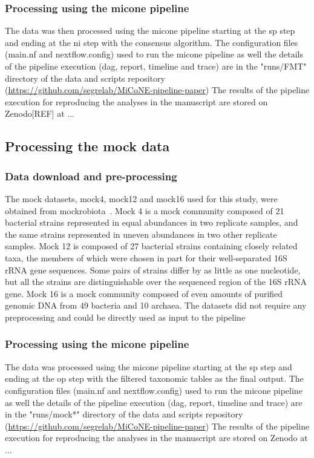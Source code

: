     \subsubsection*{Processing using the \ac{micone} pipeline}
    The data was then processed using the \ac{micone} pipeline starting at the \ac{sp} step and ending at the \ac{ni} step with the consensus algorithm.
    The configuration files (main.nf and nextflow.config) used to run the \ac{micone} pipeline as well the details of the pipeline execution (dag, report, timeline and trace) are in the "runs/FMT" directory of the data and scripts repository (\href{https://github.com/segrelab/MiCoNE-pipeline-paper}{https://github.com/segrelab/MiCoNE-pipeline-paper})
    The results of the pipeline execution for reproducing the analyses in the manuscript are stored on Zenodo[REF] at ...

  \subsection*{Processing the mock data}

    \subsubsection*{Data download and pre-processing}
    The mock datasets, mock4, mock12 and mock16 used for this study, were obtained from mockrobiota~\cite{Bokulich2016}.
    Mock 4 is a mock community composed of 21 bacterial strains represented in equal abundances in two replicate samples, and the same strains represented in uneven abundances in two other replicate samples.
    Mock 12 is composed of 27 bacterial strains containing closely related taxa, the members of which were chosen in part for their well-separated 16S rRNA gene sequences. Some pairs of strains differ by as little as one nucleotide, but all the strains are distinguishable over the sequenced region of the 16S rRNA gene.
    Mock 16 is a mock community composed of even amounts of purified genomic DNA from 49 bacteria and 10 archaea.
    The datasets did not require any preprocessing and could be directly used as input to the pipeline

    \subsubsection*{Processing using the \ac{micone} pipeline}
    The data was processed using the \ac{micone} pipeline starting at the \ac{sp} step and ending at the \ac{op} step with the filtered taxonomic tables as the final output.
    The configuration files (main.nf and nextflow.config) used to run the \ac{micone} pipeline as well the details of the pipeline execution (dag, report, timeline and trace) are in the "runs/mock*" directory of the data and scripts repository (\href{https://github.com/segrelab/MiCoNE-pipeline-paper}{https://github.com/segrelab/MiCoNE-pipeline-paper})
    The results of the pipeline execution for reproducing the analyses in the manuscript are stored on Zenodo at ...

